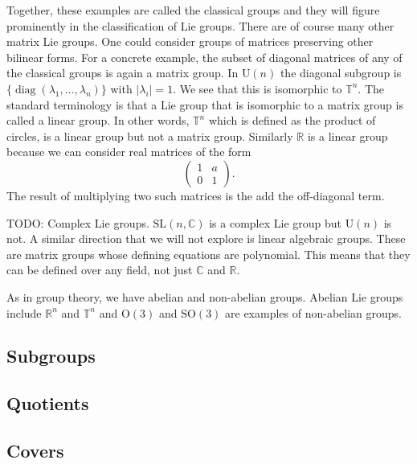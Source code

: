 \documentclass[twoside,11pt,a4paper,leqno]{article}
\numberwithin{equation}{section}
\theoremstyle{plain}
\theoremstyle{definition}
\newcommand{\bbC}{\mathbb{C}}
\newcommand{\bbR}{\mathbb{R}}
\newcommand{\bbT}{\mathbb{T}}
\newcommand{\SL}{\mathrm{SL}}
\newcommand{\U}{\mathrm{U}}
\renewcommand{\O}{\mathrm{O}}
\newcommand{\SO}{\mathrm{SO}}
\begin{document}
Together, these examples are called the classical groups and they will figure prominently in the classification of Lie groups.
There are of course many other matrix Lie groups.
One could consider groups of matrices preserving other bilinear forms. 
For a concrete example, the subset of diagonal matrices of any of the classical groups is again a matrix group.
In $\U(n)$ the diagonal subgroup is $\{\operatorname{diag}(\lambda_1,\dots,\lambda_n)\}$ with $|\lambda_i| = 1$.
We see that this is isomorphic to $\bbT^n$.
The standard terminology is that a Lie group that is isomorphic to a matrix group is called a linear group.
In other words, $\bbT^n$ which is defined as the product of circles, is a linear group but not a matrix group.
Similarly $\bbR$ is a linear group because we can consider real matrices of the form
\[
\begin{pmatrix}
1 & a \\
0 & 1
\end{pmatrix}.
\]
The result of multiplying two such matrices is the add the off-diagonal term.

TODO: Complex Lie groups. $\SL(n,\bbC)$ is a complex Lie group but $\U(n)$ is not.
A similar direction that we will not explore is linear algebraic groups.
These are matrix groups whose defining equations are polynomial.
This means that they can be defined over any field, not just $\bbC$ and $\bbR$.


As in group theory, we have abelian and non-abelian groups.
Abelian Lie groups include $\bbR^n$ and $\bbT^n$ and $\O(3)$ and $\SO(3)$ are examples of non-abelian groups.


\subsection{Subgroups}


\subsection{Quotients}


\subsection{Covers}
\end{document}
